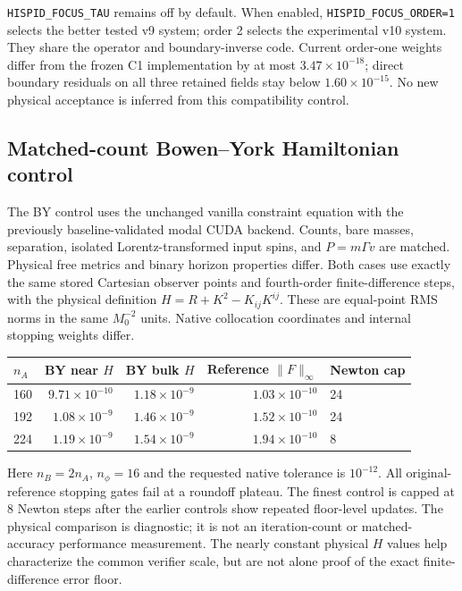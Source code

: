 \documentclass[aps,prd,preprint,notitlepage,nofootinbib]{revtex4-2}
\begin{document}
\texttt{HISPID\_FOCUS\_TAU} remains off by default. When enabled,
\texttt{HISPID\_FOCUS\_ORDER=1} selects the better tested v9 system;
order 2 selects the experimental v10 system. They share the operator and
boundary-inverse code. Current order-one weights differ from the frozen C1
implementation by at most $3.47\times10^{-18}$; direct boundary residuals on
all three retained fields stay below $1.60\times10^{-15}$. No new physical
acceptance is inferred from this compatibility control.

\subsection{Matched-count Bowen--York Hamiltonian control}
The BY control uses the unchanged vanilla constraint equation with the
previously baseline-validated modal CUDA backend. Counts, bare masses,
separation, isolated Lorentz-transformed input spins, and $P=m\Gamma v$
are matched. Physical free metrics and binary horizon properties differ.
Both cases use exactly the same stored Cartesian observer points and
fourth-order finite-difference steps, with the physical definition
$H=R+K^2-K_{ij}K^{ij}$. These are equal-point RMS norms in the same $M_0^{-2}$
units. Native collocation coordinates and internal stopping weights differ.
\begin{center}\footnotesize
\begin{tabular}{@{}lrrrl@{}}
\toprule
$n_A$ & BY near $H$ & BY bulk $H$ & Reference $\|F\|_\infty$ & Newton cap\\\midrule
160 & $9.71\times10^{-10}$ & $1.18\times10^{-9}$ & $1.03\times10^{-10}$ &24\\
192 & $1.08\times10^{-9}$ & $1.46\times10^{-9}$ & $1.52\times10^{-10}$ &24\\
224 & $1.19\times10^{-9}$ & $1.54\times10^{-9}$ & $1.94\times10^{-10}$ &8\\
\bottomrule
\end{tabular}
\end{center}
Here $n_B=2n_A$, $n_\phi=16$ and the requested native tolerance is $10^{-12}$.
All original-reference stopping gates fail at a roundoff plateau. The finest
control is capped at 8 Newton steps after the earlier controls show repeated
floor-level updates. The physical comparison is diagnostic; it is not an
iteration-count or matched-accuracy performance measurement. The nearly
constant physical $H$ values help characterize the common verifier scale,
but are not alone proof of the exact finite-difference error floor.
\end{document}
